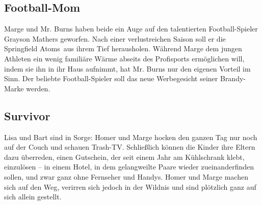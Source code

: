 
\subsection{Football-Mom}
Marge und Mr. Burns haben beide ein Auge auf den talentierten Football-Spieler Grayson Mathers geworfen. Nach einer verlustreichen Saison soll er die \glqq Springfield Atoms\grqq\ aus ihrem Tief herausholen. Während Marge dem jungen Athleten ein wenig familiäre Wärme abseits des Profisports ermöglichen will, indem sie ihn in ihr Haus aufnimmt, hat Mr. Burns nur den eigenen Vorteil im Sinn. Der beliebte Football-Spieler soll das neue Werbegesicht seiner Brandy-Marke werden.


\subsection{Survivor}
Lisa und Bart sind in Sorge: Homer und Marge hocken den ganzen Tag nur noch auf der Couch und schauen Trash-TV. Schließlich können die Kinder ihre Eltern dazu überreden, einen Gutschein, der seit einem Jahr am Kühlschrank klebt, einzulösen -- in einem Hotel, in dem gelangweilte Paare wieder zueinanderfinden sollen, und zwar ganz ohne Fernseher und Handys. Homer und Marge machen sich auf den Weg, verirren sich jedoch in der Wildnis und sind plötzlich ganz auf sich allein gestellt.


